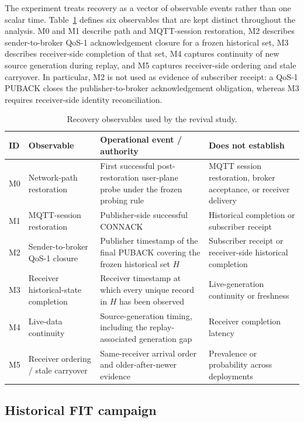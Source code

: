 \documentclass[journal]{IEEEtran}
\begin{document}
The experiment treats recovery as a vector of observable events rather than one scalar time. Table~\ref{tab:observables} defines six observables that are kept distinct throughout the analysis. M0 and M1 describe path and MQTT-session restoration, M2 describes sender-to-broker QoS-1 acknowledgement closure for a frozen historical set, M3 describes receiver-side completion of that set, M4 captures continuity of new source generation during replay, and M5 captures receiver-side ordering and stale carryover. In particular, M2 is not used as evidence of subscriber receipt: a QoS-1 PUBACK closes the publisher-to-broker acknowledgement obligation, whereas M3 requires receiver-side identity reconciliation.

\begin{table}[t]
\centering
\small
\caption{Recovery observables used by the revival study.}
\label{tab:observables}
\begin{tabular}{p{}p{}p{}p{}}
\toprule
\textbf{ID} & \textbf{Observable} & \textbf{Operational event / authority} & \textbf{Does not establish} \\
\midrule
M0 & Network-path restoration & First successful post-restoration user-plane probe under the frozen probing rule & MQTT session restoration, broker acceptance, or receiver delivery \\
M1 & MQTT-session restoration & Publisher-side successful CONNACK & Historical completion or subscriber receipt \\
M2 & Sender-to-broker QoS-1 closure & Publisher timestamp of the final PUBACK covering the frozen historical set $H$ & Subscriber receipt or receiver-side historical completion \\
M3 & Receiver historical-state completion & Receiver timestamp at which every unique record in $H$ has been observed & Live-generation continuity or freshness \\
M4 & Live-data continuity & Source-generation timing, including the replay-associated generation gap & Receiver completion latency \\
M5 & Receiver ordering / stale carryover & Same-receiver arrival order and older-after-newer evidence & Prevalence or probability across deployments \\
\bottomrule
\end{tabular}
\end{table}

\subsection{Historical FIT campaign}
\end{document}
